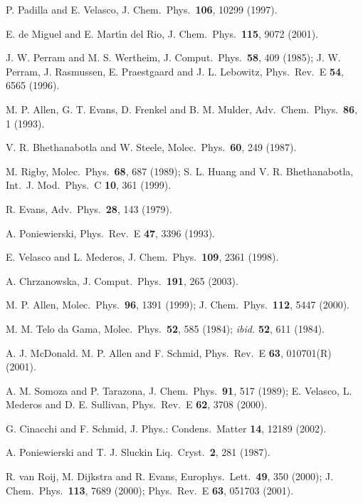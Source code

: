 \documentclass[aps,pre,twocolumn,groupedaddress,showpacs]{revtex4}
\begin{document}
\begin{thebibliography}{99}
 P. Padilla and E. Velasco, J. Chem.\ Phys.\ {\bf 106},
10299 (1997).

 E. de Miguel and E. Mart\'{\i}n del Rio, 
J. Chem.\ Phys.\ {\bf 115}, 9072 (2001).

 J. W. Perram and M. S. Wertheim,
J. Comput.\ Phys.\ {\bf 58}, 409 (1985); J. W. Perram,
J. Rasmussen, E. Praestgaard and J. L. Lebowitz, Phys.\ Rev.\ E {\bf 54},
6565 (1996).

 M. P. Allen, G. T. Evans, D. Frenkel and
B. M. Mulder, Adv.\ Chem.\ Phys.\ {\bf 86}, 1 (1993).

 V. R. Bhethanabotla and W. Steele, Molec.\ Phys.\
{\bf 60}, 249 (1987).

 M. Rigby, Molec.\ Phys.\ {\bf 68}, 687 (1989);
S. L. Huang and V. R. Bhethanabotla, Int.\ J. Mod.\ Phys.\ C {\bf 10}, 
361 (1999). 

 R. Evans, Adv.\ Phys.\ {\bf 28}, 143 (1979).

 A. Poniewierski, Phys.\ Rev.\ E {\bf 47}, 3396
(1993). 

 E. Velasco and L. Mederos,
J. Chem.\ Phys.\ {\bf 109}, 2361 (1998). 

 A. Chrzanowska, J. Comput.\ Phys.\ {\bf 191},
265 (2003).

 M. P. Allen, Molec.\ Phys.\ {\bf 96}, 1391 (1999);
J. Chem.\ Phys.\ {\bf 112}, 5447 (2000).

 M. M. Telo da Gama, Molec.\ Phys.\ {\bf 52}, 585
(1984); {\it ibid.} {\bf 52}, 611 (1984).

 A. J. McDonald. M. P. Allen and F. Schmid,
Phys.\ Rev.\ E {\bf 63}, 010701(R) (2001). 

 A. M. Somoza and P. Tarazona, J. Chem.\ Phys.\
{\bf 91}, 517 (1989); E. Velasco, L. Mederos and D. E. Sullivan,
Phys.\ Rev.\ E {\bf 62}, 3708 (2000).  

 G. Cinacchi and F. Schmid, J. Phys.: Condens.\
Matter {\bf 14}, 12189 (2002).

\bibitem{Sluckin:1987} A. Poniewierski and T. J. Sluckin Liq.\ Cryst.\
{\bf 2}, 281 (1987).

 R. van Roij, M. Dijkstra and R. Evans,
Europhys.\ Lett.\ {\bf 49}, 350 (2000); J. Chem.\ Phys.\ {\bf 113}, 7689
(2000); Phys.\ Rev.\ E {\bf 63}, 051703 (2001).


\end{thebibliography}
\end{document}
